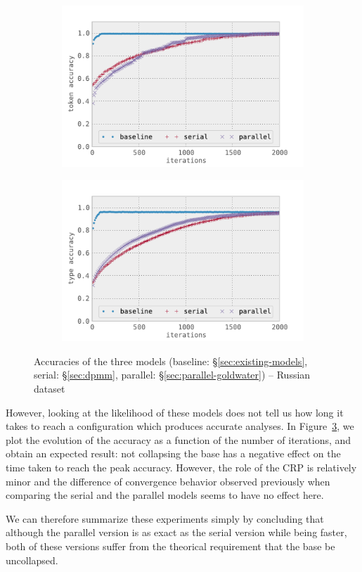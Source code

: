 \begin{figure}[h]
    \center
    \begin{subfigure}{0.48\textwidth}
        \includegraphics[width=\textwidth]{fig/token_acc}
        \label{fig:token_acc}
    \end{subfigure}
    \begin{subfigure}{0.48\textwidth}
        \includegraphics[width=\textwidth]{fig/type_acc}
        \label{fig:type_acc}
    \end{subfigure}
    \caption{Accuracies of the three models (baseline: \S\ref{sec:existing-models}, serial: \S\ref{sec:dpmm}, parallel: \S\ref{sec:parallel-goldwater}) -- Russian dataset}
    \label{fig:acc}
\end{figure}

However, looking at the likelihood of these models does not tell us how long it takes to reach a configuration which produces accurate analyses. In Figure~\ref{fig:acc}, we plot the evolution of the accuracy as a function of the number of iterations, and obtain an expected result: not collapsing the base has a negative effect on the time taken to reach the peak accuracy. However, the role of the CRP is relatively minor and the difference of convergence behavior observed previously when comparing the serial and the parallel models seems to have no effect here.

We can therefore summarize these experiments simply by concluding that although the parallel version is as exact as the serial version while being faster, both of these versions suffer from the theorical requirement that the base be uncollapsed.

